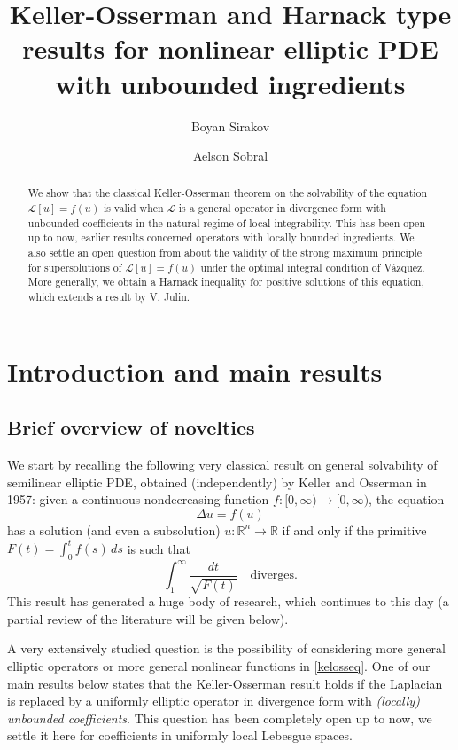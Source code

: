 \documentclass[12pt,a4paper]{amsart}
\title[Keller-Osserman and Harnack type results for elliptic PDE]{Keller-Osserman and Harnack type results for nonlinear elliptic PDE with unbounded ingredients}
\author[B. Sirakov]{Boyan Sirakov}
\author[A. Sobral]{Aelson Sobral}
\numberwithin{equation}{section} %
\theoremstyle{definition}
\theoremstyle{remark}
\begin{document}
\begin{abstract} 
We show that the classical Keller-Osserman theorem on the solvability of the equation 
$\mathcal{L}[u] = f(u)$
is valid when $\mathcal{L}$ is a general operator in divergence form with unbounded coefficients in the natural regime of local integrability. This has been open up to now, earlier results concerned operators with locally bounded ingredients. We also settle an open question from \cite{SS21} about the validity of the strong maximum principle for supersolutions of $\mathcal{L}[u] = f(u)$ under the optimal integral condition of V\'azquez. More generally, we obtain a  Harnack inequality for positive solutions of this equation, which extends a result by V. Julin. 
\end{abstract}

\maketitle





\section{Introduction and main results}
\subsection{Brief overview of novelties}
We start by recalling the following very classical result on general solvability of semilinear elliptic PDE, obtained (independently) by Keller \cite{K57} and Osserman \cite{O57} in 1957: given a continuous nondecreasing function $f\colon[0,\infty)\to [0,\infty)$, the equation 
\begin{equation}\label{kelosseq}
\Delta u = f(u)
\end{equation} 
has a solution (and even a subsolution) $u\colon\mathbb{R}^n\to \mathbb{R}$ if and only if the primitive $F(t) = \int_0^t f(s)\,ds$ is such that
\begin{equation}\label{kelosscond}
 \int_{1}^\infty \frac{dt}{\sqrt{F(t)}} \quad\mbox{diverges}.
\end{equation} 
This result has generated a huge body of research, which continues to this day (a partial review of the literature will be given below). 

A very extensively studied question is the possibility of considering more general elliptic operators or more general nonlinear functions in \eqref{kelosseq}. One of our main results below states that the Keller-Osserman result holds if the Laplacian is replaced by a uniformly elliptic operator in divergence form with {\it (locally) unbounded coefficients}. This question has been completely open up to now, we settle it here for coefficients in uniformly local Lebesgue spaces. 
\smallskip
\end{document}

